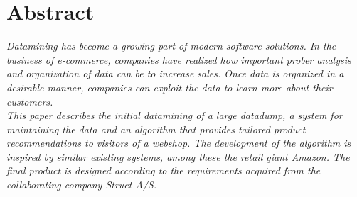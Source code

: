\chapter{Abstract}
\textit{Datamining has become a growing part of modern software solutions. In the business of e-commerce, companies have realized how important prober analysis and organization of data can be to increase sales. Once data is organized in a desirable manner, companies can exploit the data to learn more about their customers.\\
This paper describes the initial datamining of a large datadump, a system for maintaining the data and an algorithm that provides tailored product recommendations to visitors of a webshop.
The development of the algorithm is inspired by similar existing systems, among these the retail giant Amazon. The final product is designed according to the requirements acquired from the collaborating company Struct A/S.}